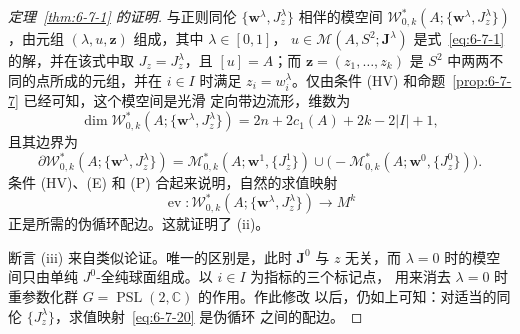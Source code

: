 \begin{proof}[定理~\ref{thm:6-7-1} 的证明]
与正则同伦 $\{\mathbf w^\lambda,J_z^\lambda\}$ 相伴的模空间
$\mathcal W^*_{0,k}(A;\{\mathbf w^\lambda,J_z^\lambda\})$，由元组
$(\lambda,u,\mathbf z)$ 组成，其中 $\lambda\in[0,1]$，
$u\in\mathcal M(A,S^2;\mathbf J^\lambda)$ 是式~\eqref{eq:6-7-1} 的解，并在该式中取
$J_z=J_z^\lambda$，且 $[u]=A$；而
$\mathbf z=(z_1,\ldots,z_k)$ 是 $S^2$ 中两两不同的点所成的元组，并在 $i\in I$ 时满足
$z_i=w_i^\lambda$。仅由条件 (HV) 和命题~\ref{prop:6-7-7} 已经可知，这个模空间是光滑
定向带边流形，维数为
\[
  \dim\mathcal W^*_{0,k}
  (A;\{\mathbf w^\lambda,J_z^\lambda\})
  =2n+2c_1(A)+2k-2|I|+1,
\]
且其边界为
\[
  \partial\mathcal W^*_{0,k}
  (A;\{\mathbf w^\lambda,J_z^\lambda\})
  =\mathcal M^*_{0,k}(A;\mathbf w^1,\{J_z^1\})
  \cup\bigl(-\mathcal M^*_{0,k}(A;\mathbf w^0,\{J_z^0\})\bigr).
\]
条件 (HV)、(E) 和 (P) 合起来说明，自然的求值映射
\begin{equation}\label{eq:6-7-20}
  \operatorname{ev}:\mathcal W^*_{0,k}(A;\{\mathbf w^\lambda,J_z^\lambda\})
  \longrightarrow M^k
\end{equation}
正是所需的伪循环配边。这就证明了 (ii)。

断言 (iii) 来自类似论证。唯一的区别是，此时 $\mathbf J^0$ 与 $z$ 无关，而
$\lambda=0$ 时的模空间只由单纯 $J^0$-全纯球面组成。以 $i\in I$ 为指标的三个标记点，
用来消去 $\lambda=0$ 时重参数化群 $G=\operatorname{PSL}(2,\mathbb C)$ 的作用。作此修改
以后，仍如上可知：对适当的同伦 $\{J_z^\lambda\}$，求值映射~\eqref{eq:6-7-20} 是伪循环
之间的配边。
\end{proof}

